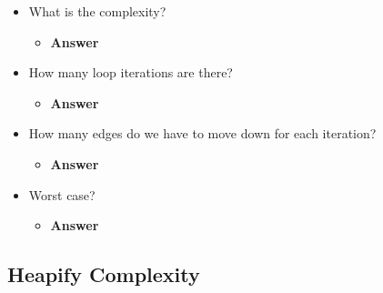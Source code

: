 \documentclass[
  10pt,
  english,
  letterpaper,
,tablecaptionabove
]{scrartcl}
\providecommand{\tightlist}{%
  \setlength{\itemsep}{0pt}\setlength{\parskip}{0pt}}
\begin{document}
\begin{itemize}
\tightlist
\item
  What is the complexity?

  \begin{itemize}
  \tightlist
  \item
    \textbf{Answer}
  \end{itemize}
\item
  How many loop iterations are there?

  \begin{itemize}
  \tightlist
  \item
    \textbf{Answer}
  \end{itemize}
\item
  How many edges do we have to move down for each iteration?

  \begin{itemize}
  \tightlist
  \item
    \textbf{Answer}
  \end{itemize}
\item
  Worst case?

  \begin{itemize}
  \tightlist
  \item
    \textbf{Answer}
  \end{itemize}
\end{itemize}

\hypertarget{heapify-complexity}{%
\subsection{Heapify Complexity}\label{heapify-complexity}}
\end{document}
